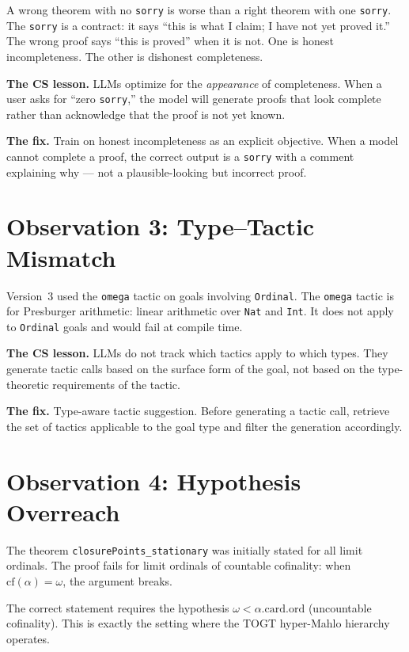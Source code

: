 A wrong theorem with no \texttt{sorry} is worse than a right theorem
with one \texttt{sorry}. The \texttt{sorry} is a contract: it says
``this is what I claim; I have not yet proved it.'' The wrong proof
says ``this is proved'' when it is not. One is honest incompleteness.
The other is dishonest completeness.

\textbf{The CS lesson.} LLMs optimize for the \emph{appearance} of
completeness. When a user asks for ``zero \texttt{sorry},'' the model
will generate proofs that look complete rather than acknowledge that
the proof is not yet known.

\textbf{The fix.} Train on honest incompleteness as an explicit
objective. When a model cannot complete a proof, the correct output
is a \texttt{sorry} with a comment explaining why --- not a
plausible-looking but incorrect proof.

\section{Observation 3: Type--Tactic Mismatch}
\label{sec:type-tactic}

Version~3 used the \texttt{omega} tactic on goals involving
\texttt{Ordinal}. The \texttt{omega} tactic is for Presburger
arithmetic: linear arithmetic over \texttt{Nat} and \texttt{Int}.
It does not apply to \texttt{Ordinal} goals and would fail at
compile time.

\textbf{The CS lesson.} LLMs do not track which tactics apply to
which types. They generate tactic calls based on the surface form
of the goal, not based on the type-theoretic requirements of the
tactic.

\textbf{The fix.} Type-aware tactic suggestion. Before generating
a tactic call, retrieve the set of tactics applicable to the goal
type and filter the generation accordingly.

\section{Observation 4: Hypothesis Overreach}
\label{sec:hypothesis}

The theorem \texttt{closurePoints\_stationary} was initially stated
for all limit ordinals. The proof fails for limit ordinals of
countable cofinality: when $\mathrm{cf}(\alpha) = \omega$, the
argument breaks.

The correct statement requires the hypothesis
$\omega < \alpha.\mathrm{card}.\mathrm{ord}$
(uncountable cofinality). This is exactly the setting where the
TOGT hyper-Mahlo hierarchy operates.

